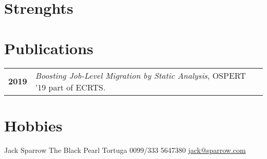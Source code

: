 \documentclass[grey]{hipstercv}
\newlength{\rightcolwidth}
\begin{document}
\begin{paracol}{2}
\begin{minipage}[t]{0.3\textwidth}
\section*{Strenghts}
\end{minipage}\hfill
\begin{minipage}[t]{0.3\textwidth}
\section*{Publications}
\begin{tabular}{>{\footnotesize\bfseries}r >{\footnotesize}p{}}
    2019 & \emph{Boosting Job-Level Migration by Static Analysis}, OSPERT '19 part of ECRTS. \\
\end{tabular}
\section*{Hobbies}
\end{minipage}

\vfill{} %
\vspace{2em}

\setlength{\parindent}{0pt}
\begin{minipage}[t]{\rightcolwidth}
\begin{center}\fontfamily{\sfdefault}\selectfont \color{black!70}
{\small Jack Sparrow  The Black Pearl  Tortuga  0099/333 5647380 \newline{} \protect\url{jack@sparrow.com}
}
\end{center}
\end{minipage}


\end{paracol}
\end{document}
